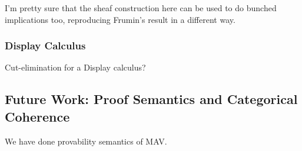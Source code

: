 I'm pretty sure that the sheaf construction here can be used to do
bunched implications too, reproducing Frumin's result in a different
way.

\subsubsection{Display Calculus}

Cut-elimination for a Display calculus?

\subsection{Future Work: Proof Semantics and Categorical Coherence}

We have done provability semantics of MAV.
